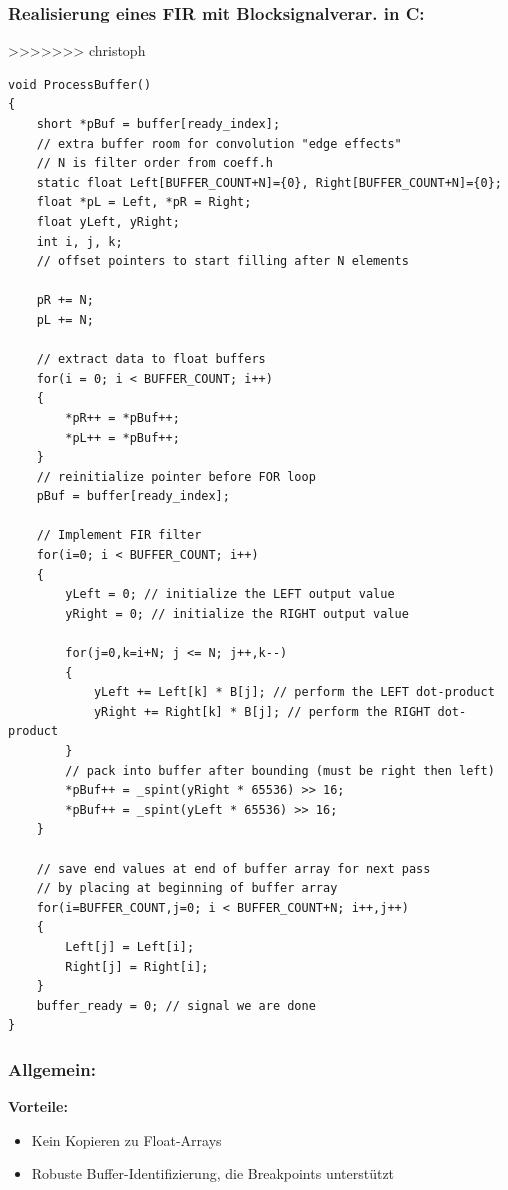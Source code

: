 \documentclass[10pt,a4paper]{article}
\begin{document}
\subsubsection{Realisierung eines FIR mit Blocksignalverar. in C:}
\begin{minipage}{0.5\textwidth}
>>>>>>> christoph
\begin{verbatim}
void ProcessBuffer()
{
    short *pBuf = buffer[ready_index];
    // extra buffer room for convolution "edge effects"
    // N is filter order from coeff.h
    static float Left[BUFFER_COUNT+N]={0}, Right[BUFFER_COUNT+N]={0};
    float *pL = Left, *pR = Right;
    float yLeft, yRight;
    int i, j, k;
    // offset pointers to start filling after N elements
    
    pR += N;
    pL += N;

    // extract data to float buffers
    for(i = 0; i < BUFFER_COUNT; i++) 
    { 
        *pR++ = *pBuf++;
        *pL++ = *pBuf++;
    }
    // reinitialize pointer before FOR loop
    pBuf = buffer[ready_index];

    // Implement FIR filter
    for(i=0; i < BUFFER_COUNT; i++) 
    {
        yLeft = 0; // initialize the LEFT output value
        yRight = 0; // initialize the RIGHT output value

        for(j=0,k=i+N; j <= N; j++,k--) 
        {
            yLeft += Left[k] * B[j]; // perform the LEFT dot-product
            yRight += Right[k] * B[j]; // perform the RIGHT dot-product
        }
        // pack into buffer after bounding (must be right then left)
        *pBuf++ = _spint(yRight * 65536) >> 16;
        *pBuf++ = _spint(yLeft * 65536) >> 16;
    }

    // save end values at end of buffer array for next pass
    // by placing at beginning of buffer array
    for(i=BUFFER_COUNT,j=0; i < BUFFER_COUNT+N; i++,j++) 
    {
        Left[j] = Left[i];
        Right[j] = Right[i];
    }
    buffer_ready = 0; // signal we are done
}
\end{verbatim}
\end{minipage}
\newpage
\subsubsection{Allgemein:}
\textbf{Vorteile:}
\begin{itemize}
  \item Kein Kopieren zu Float-Arrays
  \item Robuste Buffer-Identifizierung, die Breakpoints unterstützt
\end{itemize}
\end{document}
